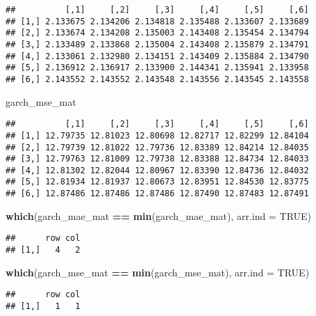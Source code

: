 \documentclass[]{article}
\newenvironment{Shaded}{\begin{snugshade}}{\end{snugshade}}
\newcommand{\KeywordTok}[1]{\textcolor[rgb]{0.13,0.29,0.53}{\textbf{#1}}}
\newcommand{\DataTypeTok}[1]{\textcolor[rgb]{0.13,0.29,0.53}{#1}}
\newcommand{\StringTok}[1]{\textcolor[rgb]{0.31,0.60,0.02}{#1}}
\newcommand{\OtherTok}[1]{\textcolor[rgb]{0.56,0.35,0.01}{#1}}
\newcommand{\OperatorTok}[1]{\textcolor[rgb]{0.81,0.36,0.00}{\textbf{#1}}}
\newcommand{\NormalTok}[1]{#1}
\begin{document}
\begin{verbatim}
##          [,1]     [,2]     [,3]     [,4]     [,5]     [,6]
## [1,] 2.133675 2.134206 2.134818 2.135488 2.133607 2.133689
## [2,] 2.133674 2.134208 2.135003 2.143408 2.135454 2.134794
## [3,] 2.133489 2.133868 2.135004 2.143408 2.135879 2.134791
## [4,] 2.133061 2.132980 2.134151 2.143409 2.135884 2.134790
## [5,] 2.136912 2.136917 2.133900 2.144341 2.135941 2.133958
## [6,] 2.143552 2.143552 2.143548 2.143556 2.143545 2.143558
\end{verbatim}

\begin{Shaded}
\begin{Highlighting}[]
\NormalTok{garch_mse_mat}
\end{Highlighting}
\end{Shaded}

\begin{verbatim}
##          [,1]     [,2]     [,3]     [,4]     [,5]     [,6]
## [1,] 12.79735 12.81023 12.80698 12.82717 12.82299 12.84104
## [2,] 12.79739 12.81022 12.79736 12.83389 12.84214 12.84035
## [3,] 12.79763 12.81009 12.79738 12.83388 12.84734 12.84033
## [4,] 12.81302 12.82044 12.80967 12.83390 12.84736 12.84032
## [5,] 12.81934 12.81937 12.80673 12.83951 12.84530 12.83775
## [6,] 12.87486 12.87486 12.87486 12.87490 12.87483 12.87491
\end{verbatim}

\begin{Shaded}
\begin{Highlighting}[]
\KeywordTok{which}\NormalTok{(garch_mae_mat }\OperatorTok{==}\StringTok{ }\KeywordTok{min}\NormalTok{(garch_mae_mat), }\DataTypeTok{arr.ind =} \OtherTok{TRUE}\NormalTok{)}
\end{Highlighting}
\end{Shaded}

\begin{verbatim}
##      row col
## [1,]   4   2
\end{verbatim}

\begin{Shaded}
\begin{Highlighting}[]
\KeywordTok{which}\NormalTok{(garch_mse_mat }\OperatorTok{==}\StringTok{ }\KeywordTok{min}\NormalTok{(garch_mse_mat), }\DataTypeTok{arr.ind =} \OtherTok{TRUE}\NormalTok{)}
\end{Highlighting}
\end{Shaded}

\begin{verbatim}
##      row col
## [1,]   1   1
\end{verbatim}
\end{document}
